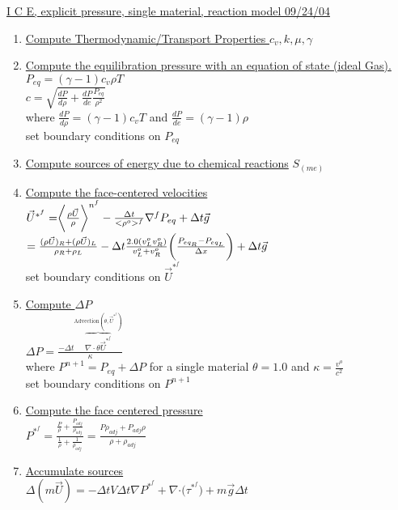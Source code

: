 \documentclass[fleqn]{article}
\newcommand{\bigS}[1]   {\ensuremath{S_{#1}}  }
\newcommand{\B}[1]      {\biggr{#1}}
\newcommand{\U}         {{\vec{U}}}
\newcommand{\rhoM}      {\ensuremath{\rho^{o}}}
\newcommand{\delt}      {\ensuremath{\Delta{t}} }
\newcommand{\sv}[1]     {\ensuremath{v^o_{{#1}} }}
\begin{document}
\setlength{\abovedisplayskip}{0.1in}
\setlength{\mathindent}{0.0in}
\doublespacing
\underline{ I C E, explicit pressure, single material, reaction model  \hspace{ 0.5in}09/24/04}

\begin{enumerate}
\item \underline{Compute Thermodynamic/Transport Properties
$c_v, k, \mu, \gamma$}
\item \underline{Compute the equilibration pressure with an equation of state (ideal Gas).}\\
$P_{eq} = (\gamma -1) c_v \rho T$\\
$c = \sqrt{ \frac{dP}{d\rho} + \frac{dP}{de} \frac{P_{eq}}{\rho^2} }$\\
where
$\frac{dP}{d\rho} = (\gamma -1) c_v T$ and 
$\frac{dP}{de} = (\gamma - 1) \rho$ \\
set boundary conditions on $P_{eq}$
\item \underline{Compute sources of energy due to chemical reactions} 
$\bigS{(m e)}$
\item \underline{Compute the face-centered velocities}\\
  $ \vec{U}^{*^{f}} 
    = \B{<} \frac{ \rho \U }{\rho} \B{>}^{n^{f}}
    - \frac{ \delt }{< \rhoM >^f} \nabla^{f} P_{eq}
     + \delt\vec{g} $ \\
$    
   =\frac{(\rho \U)_{R} + (\rho \U)_{L}}{\rho_{R} + \rho_{L}}
   -\delt \frac{2.0 (\sv{L} \sv{R})}  {\sv{L} + \sv{R}}  \B{(} \frac{P_{eq_R} - P_{eq_L}}{\Delta x}\B{)}
   + \delt\vec{g} $ \\
set boundary conditions on $\vec{U}^{*^{f}}$
%
\item \underline{Compute $\Delta P$}  \\
$     \Delta P =  
              \frac{  - \Delta{t} \overbrace{ \nabla \cdot \theta \vec{U}^{*^{f}} } ^{\text{Advection}(\theta, \vec{U}^{*^{f}}) } }
              {\kappa} $\\
where $P^{n+1} = P_{eq} + \Delta{P}$ for a single material $\theta = 1.0$ and $\kappa = \frac{v^o}{c^2}$ \\
set boundary conditions on $P^{n+1}$
%
\item \underline{Compute the face centered pressure}\\
$ P^{*^{f}} = \frac{\frac{P}{\rho} + \frac{P_{adj}}{\rho_{adj}}}
                     {\frac{1}{\rho} + \frac{1}{\rho_{adj}}}
              =\frac{ {P \rho_{adj}} + {P_{adj} \rho }  }
                 { {\rho} + {\rho_{adj}  }  } $
%
\item \underline{Accumulate sources}\\  
 $\Delta(m\vec{U}) = 
    - \delt V \delt \nabla{ P^{*^f}} 
    + \nabla{ \cdot (\tau^{*^f}})
    + m \vec{g}\delt$
    

\end{enumerate}
\end{document}
